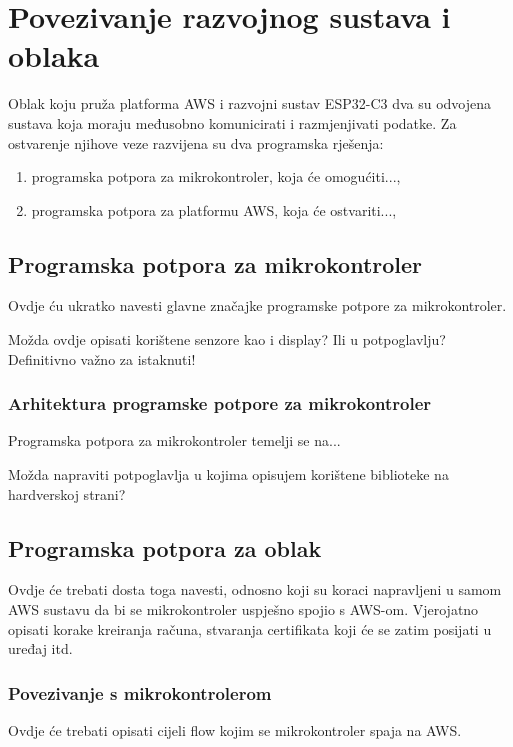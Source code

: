 \chapter{Povezivanje razvojnog sustava i oblaka}

Oblak koju pruža platforma AWS i razvojni sustav ESP32-C3 dva su odvojena sustava koja moraju međusobno komunicirati i razmjenjivati podatke. Za ostvarenje njihove veze razvijena su dva programska rješenja:
\begin{enumerate}
	\item programska potpora za mikrokontroler, koja će omogućiti...,
	\item programska potpora za platformu AWS, koja će ostvariti...,
\end{enumerate} 

\section{Programska potpora za mikrokontroler}

Ovdje ću ukratko navesti glavne značajke programske potpore za mikrokontroler.

Možda ovdje opisati korištene senzore kao i display? Ili u potpoglavlju? Definitivno važno za istaknuti!

\subsection{Arhitektura programske potpore za mikrokontroler}

Programska potpora za mikrokontroler temelji se na... 

Možda napraviti potpoglavlja u kojima opisujem korištene biblioteke na hardverskoj strani?

\section{Programska potpora za oblak}

Ovdje će trebati dosta toga navesti, odnosno koji su koraci napravljeni u samom AWS sustavu da bi se mikrokontroler uspješno spojio s AWS-om. Vjerojatno opisati korake kreiranja računa, stvaranja certifikata koji će se zatim posijati u uređaj itd. 

\subsection{Povezivanje s mikrokontrolerom}

Ovdje će trebati opisati cijeli flow kojim se mikrokontroler spaja na AWS.